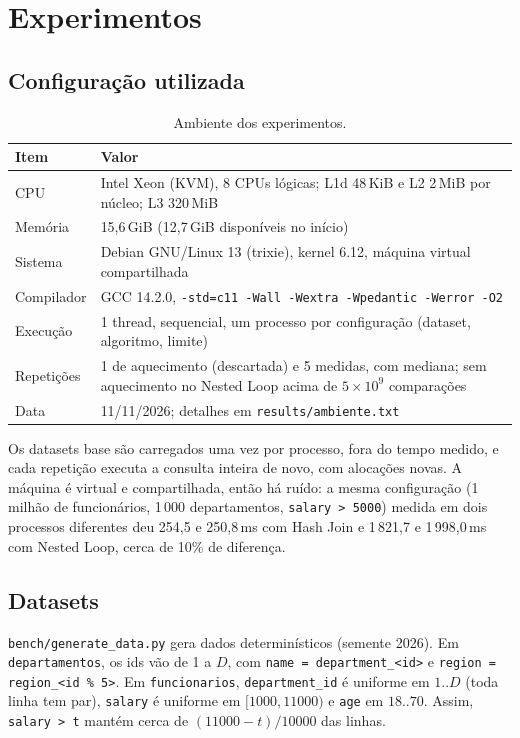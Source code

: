\documentclass[11pt,a4paper]{article}
\begin{document}
\section{Experimentos}\label{sec:experimentos}

\subsection{Configuração utilizada}
\begin{table}[H]
\centering
\small
\begin{tabular}{@{}p{3.0cm}p{13.4cm}@{}}
\toprule
Item & Valor \\
\midrule
CPU & Intel Xeon (KVM), 8 CPUs lógicas; L1d 48\,KiB e L2 2\,MiB por núcleo; L3 320\,MiB \\
Memória & 15,6\,GiB (12,7\,GiB disponíveis no início) \\
Sistema & Debian GNU/Linux 13 (trixie), kernel 6.12, máquina virtual compartilhada \\
Compilador & GCC 14.2.0, \texttt{-std=c11 -Wall -Wextra -Wpedantic -Werror -O2} \\
Execução & 1 thread, sequencial, um processo por configuração (dataset, algoritmo, limite) \\
Repetições & 1 de aquecimento (descartada) e 5 medidas, com mediana; sem aquecimento no Nested Loop acima de $5 \times 10^9$ comparações \\
Data & 11/11/2026; detalhes em \texttt{results/ambiente.txt} \\
\bottomrule
\end{tabular}
\caption{Ambiente dos experimentos.}
\label{tab:ambiente}
\end{table}

Os datasets base são carregados uma vez por processo, fora do tempo medido, e cada repetição executa a consulta inteira de novo, com alocações novas. A máquina é virtual e compartilhada, então há ruído: a mesma configuração (1 milhão de funcionários, 1\,000 departamentos, \texttt{salary > 5000}) medida em dois processos diferentes deu 254,5 e 250,8\,ms com Hash Join e 1\,821,7 e 1\,998,0\,ms com Nested Loop, cerca de 10\% de diferença.

\subsection{Datasets}
\texttt{bench/generate\_data.py} gera dados determinísticos (semente 2026). Em \texttt{departamentos}, os ids vão de 1 a $D$, com \texttt{name = department\_<id>} e \texttt{region = region\_<id \% 5>}. Em \texttt{funcionarios}, \texttt{department\_id} é uniforme em $1..D$ (toda linha tem par), \texttt{salary} é uniforme em $[1000, 11000)$ e \texttt{age} em $18..70$. Assim, \texttt{salary > t} mantém cerca de $(11000 - t)/10000$ das linhas.
\end{document}
